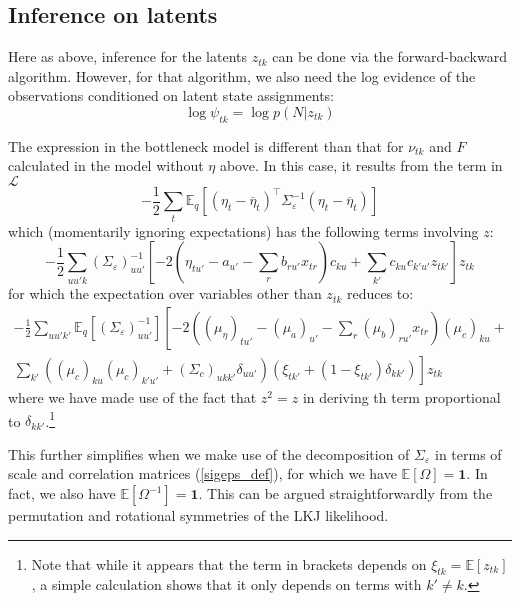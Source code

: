 \documentclass[11pt]{article}
\begin{document}
\subsection{Inference on latents}
Here as above, inference for the latents $z_{tk}$ can be done via the forward-backward algorithm. However, for that algorithm, we also need the log evidence of the observations conditioned on latent state assignments:
\begin{equation}
    \log \psi_{tk} = \log p(N|z_{tk})
\end{equation}

The expression in the bottleneck model is different than that for $\nu_{tk}$ and $F$ calculated in the model without $\eta$ above. In this case, it results from the term in $\mathcal{L}$
\begin{equation}
    - \frac{1}{2} \sum_{t} \mathbb{E}_q \left[
    (\eta_t - \overline{\eta}_t)^\top \Sigma_\varepsilon^{-1}(\eta_t - \overline{\eta}_t) \right]
\end{equation}
which (momentarily ignoring expectations) has the following terms involving $z$:
\begin{equation}
    -\frac{1}{2}\sum_{uu'k}\left(\Sigma_\varepsilon\right)^{-1}_{uu'} \left[-2(\eta_{tu'} - a_{u'} - \sum_r b_{ru'} x_{tr})c_{ku} + \sum_{k'}c_{ku}c_{k'u'}z_{tk'}\right]z_{tk}
\end{equation}
for which the expectation over variables other than $z_{tk}$ reduces to:
\begin{multline}
    -\frac{1}{2}\sum_{uu'k'}\mathbb{E}_q\left[\left(\Sigma_\varepsilon\right)^{-1}_{uu'}\right]
    \left[-2\left((\mu_\eta)_{tu'} - (\mu_a)_{u'} - \sum_r (\mu_b)_{ru'} x_{tr}\right)
    (\mu_c)_{ku} + \right. \\
    \left.
    \sum_{k'}((\mu_c)_{ku}(\mu_c)_{k'u'} + (\Sigma_c)_{ukk'}\delta_{uu'})(\xi_{tk'} + (1 - \xi_{tk'})\delta_{kk'})\right]z_{tk}
\end{multline}
where we have made use of the fact that $z^2 = z$ in deriving th term proportional to $\delta_{kk'}$.\footnote{Note that while it appears that the term in brackets depends on $\xi_{tk} = \mathbb{E}[z_{tk}]$, a simple calculation shows that it only depends on terms with $k' \neq k$.}

This further simplifies when we make use of the decomposition of $\Sigma_\varepsilon$ in terms of scale and correlation matrices (\ref{sigeps_def}), for which we have $\mathbb{E}[\Omega] = \mathbf{1}$. In fact, we also have $\mathbb{E}[\Omega^{-1}] = \mathbf{1}$. This can be argued straightforwardly from the permutation and rotational symmetries of the LKJ likelihood.
\end{document}
